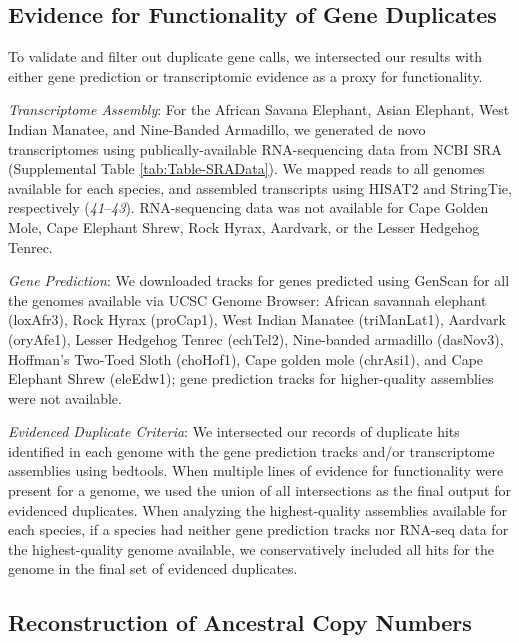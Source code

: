 \documentclass[]{elsarticle} %
\begin{document}
\hypertarget{evidence-for-functionality-of-gene-duplicates}{%
\subsection{Evidence for Functionality of Gene Duplicates}\label{evidence-for-functionality-of-gene-duplicates}}

To validate and filter out duplicate gene calls, we intersected our results with either gene prediction or transcriptomic evidence as a proxy for functionality.

\emph{Transcriptome Assembly}: For the African Savana Elephant, Asian Elephant, West Indian Manatee, and Nine-Banded Armadillo, we generated de novo transcriptomes using publically-available RNA-sequencing data from NCBI SRA (Supplemental Table \ref{tab:Table-SRAData}). We mapped reads to all genomes available for each species, and assembled transcripts using HISAT2 and StringTie, respectively (\emph{41}--\emph{43}). RNA-sequencing data was not available for Cape Golden Mole, Cape Elephant Shrew, Rock Hyrax, Aardvark, or the Lesser Hedgehog Tenrec.

\emph{Gene Prediction}: We downloaded tracks for genes predicted using GenScan for all the genomes available via UCSC Genome Browser: African savannah elephant (loxAfr3), Rock Hyrax (proCap1), West Indian Manatee (triManLat1), Aardvark (oryAfe1), Lesser Hedgehog Tenrec (echTel2), Nine-banded armadillo (dasNov3), Hoffman's Two-Toed Sloth (choHof1), Cape golden mole (chrAsi1), and Cape Elephant Shrew (eleEdw1); gene prediction tracks for higher-quality assemblies were not available.

\emph{Evidenced Duplicate Criteria}: We intersected our records of duplicate hits identified in each genome with the gene prediction tracks and/or transcriptome assemblies using bedtools. When multiple lines of evidence for functionality were present for a genome, we used the union of all intersections as the final output for evidenced duplicates. When analyzing the highest-quality assemblies available for each species, if a species had neither gene prediction tracks nor RNA-seq data for the highest-quality genome available, we conservatively included all hits for the genome in the final set of evidenced duplicates.

\hypertarget{reconstruction-of-ancestral-copy-numbers}{%
\subsection{Reconstruction of Ancestral Copy Numbers}\label{reconstruction-of-ancestral-copy-numbers}}
\end{document}
